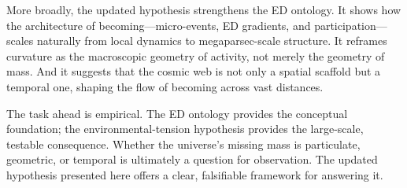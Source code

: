 More broadly, the updated hypothesis strengthens the ED ontology. It
shows how the architecture of becoming---micro-events, ED gradients, and
participation---scales naturally from local dynamics to megaparsec-scale
structure. It reframes curvature as the macroscopic geometry of
activity, not merely the geometry of mass. And it suggests that the
cosmic web is not only a spatial scaffold but a temporal one, shaping
the flow of becoming across vast distances.

The task ahead is empirical. The ED ontology provides the conceptual
foundation; the environmental-tension hypothesis provides the
large-scale, testable consequence. Whether the universe's missing mass
is particulate, geometric, or temporal is ultimately a question for
observation. The updated hypothesis presented here offers a clear,
falsifiable framework for answering it.
